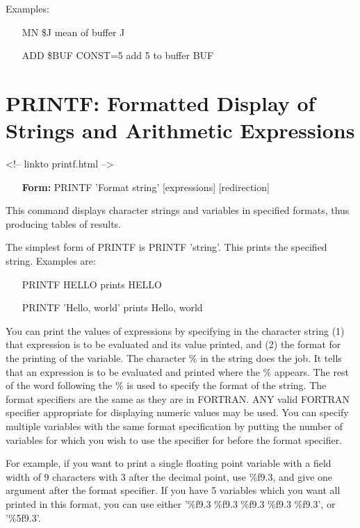 Examples:
\begin{itemize}
  \item[MN \$J\hfill]{mean of buffer J}
  \item[ADD \$BUF CONST=5\hfill]{add 5 to buffer BUF}
\end{itemize}

\section{PRINTF: Formatted Display of Strings and Arithmetic Expressions}
\begin{rawhtml}
<!-- linkto printf.html -->
\end{rawhtml}

\begin{itemize}
  \item[\textbf{Form: } PRINTF 'Format string' {[expressions]} {[redirection]}\hfill]{}
\end{itemize}
This command displays character strings and variables in specified formats,
thus producing tables of results.

The simplest form of PRINTF is PRINTF 'string'.  This prints the specified
string.  Examples are:
\begin{itemize}
  \item[PRINTF HELLO\hfill]{prints HELLO}
  \item[PRINTF 'Hello, world'\hfill]{prints Hello, world}
\end{itemize}

You can print the values of expressions by specifying in the character
string (1) that expression is to be evaluated and its value printed, and
(2) the format for the printing of the variable.  The character \% in the
string does the job. It tells that an expression is to be evaluated and
printed where the \% appears. The rest of the word following the \% is used
to specify the format of the string.  The format specifiers are the same as
they are in FORTRAN.  ANY valid FORTRAN specifier appropriate for
displaying numeric values may be used. You can specify multiple variables
with the same format specification by putting the number of variables for
which you wish to use the specifier for before the format specifier.

For example, if you want to print a single floating point variable with a
field width of 9 characters with 3 after the decimal point, use
\%f9.3, and give one argument after the format specifier. If you have
5 variables which you want all printed in this format, you can use
either '\%f9.3 \%f9.3 \%f9.3 \%f9.3 \%f9.3', or '\%5f9.3'.

